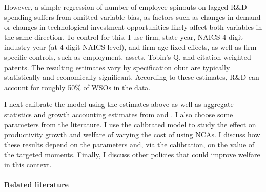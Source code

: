 \documentclass[11pt,english]{article}
\theoremstyle{remark}
\begin{document}
However, a simple regression of number of employee spinouts on lagged R\&D spending suffers from omitted variable bias, as factors such as changes in demand or changes in technological investment opportunities likely affect both variables in the same direction. To control for this, I use firm, state-year, NAICS 4 digit industry-year (at 4-digit NAICS level), and firm age fixed effects, as well as firm-specific controls, such as employment, assets, Tobin's Q, and citation-weighted patents. The resulting estimates vary by specification obut are typically statistically and economically significant. According to these estimates, R\&D can account for roughly 50\% of WSOs in the data. 

I next calibrate the model using the estimates above as well as aggregate statistics and growth accounting estimates from \cite{garcia-macia_how_2019} and \cite{klenow_innovative_2020}. I also choose some parameters from the literature. I use the calibrated model to study the effect on productivity growth and welfare of varying the cost of using NCAs. I discuss how these results depend on the parameters and, via the calibration, on the value of the targeted moments. Finally, I discuss other policies that could improve welfare in this context.

\paragraph{Related literature}
\end{document}
